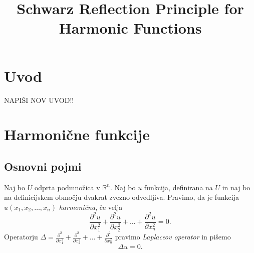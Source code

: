 \documentclass[mat1, tisk]{fmfdelo}
\title{Schwarz Reflection Principle for Harmonic Functions}
\begin{document}
\section{Uvod}

NAPIŠI NOV UVOD!!

%
\section{Harmonične funkcije}
\subsection{Osnovni pojmi}
    \begin{definicija}
        \label{harm}
        Naj bo $U$ odprta podmnožica v $\mathbb{R}^n$. Naj bo $u$ funkcija, definirana na $U$ in naj bo na definicijskem območju dvakrat zvezno odvedljiva.  
        Pravimo, da je funkcija $u(x_1, x_2, \dots, x_n)$ \emph{harmonična}, če velja
        $$
        \frac{\partial^2 u}{\partial x_1 ^ 2} +  \frac{\partial^2 u}{\partial x_2 ^ 2} + \dots + \frac{\partial^2 u}{\partial x_n ^ 2} = 0.
        $$
        Operatorju $\Delta  = \frac{\partial^2}{\partial x_1 ^ 2} +  \frac{\partial^2}{\partial x_2 ^ 2} + \dots + \frac{\partial^2}{\partial x_n ^ 2}$ pravimo \emph{Laplaceov operator} in pišemo
        $$
        \Delta u = 0.
        $$
    \end{definicija}
\end{document}
